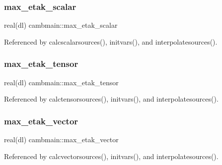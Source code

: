 \mbox{\label{namespacecambmain_ac4c24515e982e0af0ef3997027302e04}} 
\subsubsection{\texorpdfstring{max\+\_\+etak\+\_\+scalar}{max\_etak\_scalar}}
{\footnotesize\ttfamily real(dl) cambmain\+::max\+\_\+etak\+\_\+scalar\hspace{0.3cm}{\ttfamily [private]}}



Referenced by calcscalarsources(), initvars(), and interpolatesources().

\mbox{\label{namespacecambmain_a16f888ec18bcb88fb88b604ee1c858de}} 
\subsubsection{\texorpdfstring{max\+\_\+etak\+\_\+tensor}{max\_etak\_tensor}}
{\footnotesize\ttfamily real(dl) cambmain\+::max\+\_\+etak\+\_\+tensor\hspace{0.3cm}{\ttfamily [private]}}



Referenced by calctensorsources(), initvars(), and interpolatesources().

\mbox{\label{namespacecambmain_a070e24f1ae1246e4d6b1ad8aacc87919}} 
\subsubsection{\texorpdfstring{max\+\_\+etak\+\_\+vector}{max\_etak\_vector}}
{\footnotesize\ttfamily real(dl) cambmain\+::max\+\_\+etak\+\_\+vector\hspace{0.3cm}{\ttfamily [private]}}



Referenced by calcvectorsources(), initvars(), and interpolatesources().

